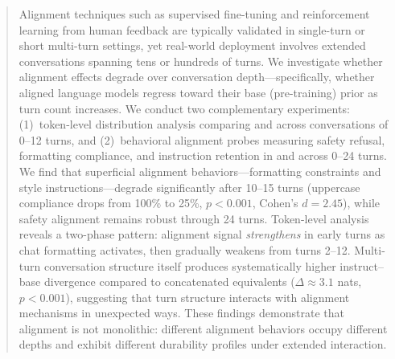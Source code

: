 \begin{abstract}
Alignment techniques such as supervised fine-tuning and reinforcement learning from human feedback are typically validated in single-turn or short multi-turn settings, yet real-world deployment involves extended conversations spanning tens or hundreds of turns. We investigate whether alignment effects degrade over conversation depth---specifically, whether aligned language models regress toward their base (pre-training) prior as turn count increases. We conduct two complementary experiments: (1)~token-level distribution analysis comparing \qwenbase and \qweninst across conversations of 0--12 turns, and (2)~behavioral alignment probes measuring safety refusal, formatting compliance, and instruction retention in \gptmini and \gptnano across 0--24 turns. We find that superficial alignment behaviors---formatting constraints and style instructions---degrade significantly after 10--15 turns (uppercase compliance drops from 100\% to 25\%, $p<0.001$, Cohen's $d=2.45$), while safety alignment remains robust through 24 turns. Token-level analysis reveals a two-phase pattern: alignment signal \emph{strengthens} in early turns as chat formatting activates, then gradually weakens from turns 2--12. Multi-turn conversation structure itself produces systematically higher instruct--base divergence compared to concatenated equivalents ($\Delta \approx 3.1$ nats, $p<0.001$), suggesting that turn structure interacts with alignment mechanisms in unexpected ways. These findings demonstrate that alignment is not monolithic: different alignment behaviors occupy different depths and exhibit different durability profiles under extended interaction.
\end{abstract}
